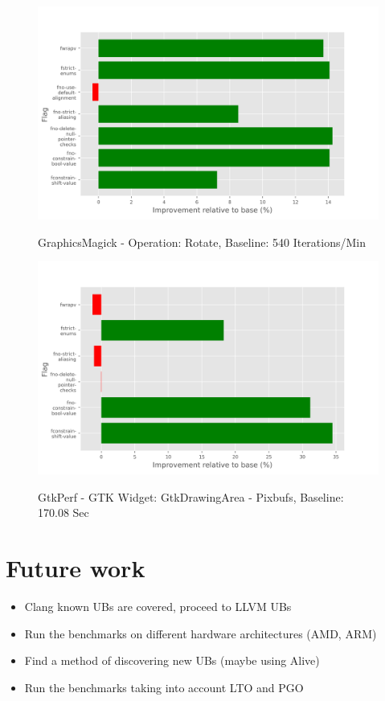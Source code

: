 \documentclass{sciposter}
\begin{document}
\begin{multicols}{3}
\begin{figure}[h!]
\centering
\includegraphics[scale=1.3]{graphicsmagick} \\
\caption{GraphicsMagick - Operation: Rotate, Baseline: 540 Iterations/Min}
\end{figure}

\begin{figure}[h!]
\centering
\includegraphics[scale=1.3]{gtkperf} \\
\caption{GtkPerf - GTK Widget: GtkDrawingArea - Pixbufs, Baseline: 170.08 Sec}
\end{figure}

\section{Future work}
\begin{itemize}
\item Clang known UBs are covered, proceed to LLVM UBs
\item Run the benchmarks on different hardware architectures (AMD, ARM)
\item Find a method of discovering new UBs (maybe using Alive)
\item Run the benchmarks taking into account LTO and PGO
\end{itemize}


\end{multicols}
\end{document}
